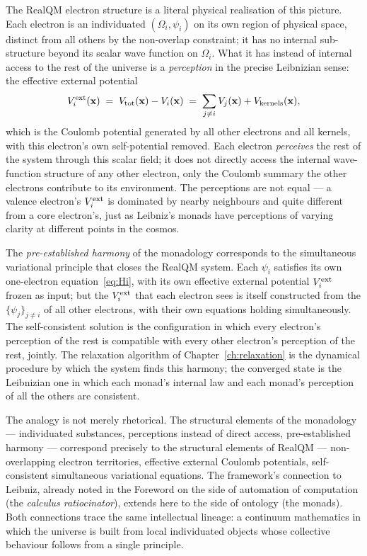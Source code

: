 The RealQM electron structure is a literal physical realisation of this picture. Each electron is an individuated $(\Omega_i, \psi_i)$ on its own region of physical space, distinct from all others by the non-overlap constraint; it has no internal sub-structure beyond its scalar wave function on $\Omega_i$. What it has instead of internal access to the rest of the universe is a \emph{perception} in the precise Leibnizian sense: the effective external potential
\[
V_i^{\rm ext}(\mathbf{x}) \;=\; V_{\rm tot}(\mathbf{x}) - V_i(\mathbf{x}) \;=\; \sum_{j \ne i} V_j(\mathbf{x}) + V_{\rm kernels}(\mathbf{x}),
\]
which is the Coulomb potential generated by all other electrons and all kernels, with this electron's own self-potential removed. Each electron \emph{perceives} the rest of the system through this scalar field; it does not directly access the internal wave-function structure of any other electron, only the Coulomb summary the other electrons contribute to its environment. The perceptions are not equal --- a valence electron's $V_i^{\rm ext}$ is dominated by nearby neighbours and quite different from a core electron's, just as Leibniz's monads have perceptions of varying clarity at different points in the cosmos.

The \emph{pre-established harmony} of the monadology corresponds to the simultaneous variational principle that closes the RealQM system. Each $\psi_i$ satisfies its own one-electron equation~\eqref{eq:Hi}, with its own effective external potential $V_i^{\rm ext}$ frozen as input; but the $V_i^{\rm ext}$ that each electron sees is itself constructed from the $\{\psi_j\}_{j \ne i}$ of all other electrons, with their own equations holding simultaneously. The self-consistent solution is the configuration in which every electron's perception of the rest is compatible with every other electron's perception of the rest, jointly. The relaxation algorithm of Chapter~\ref{ch:relaxation} is the dynamical procedure by which the system finds this harmony; the converged state is the Leibnizian one in which each monad's internal law and each monad's perception of all the others are consistent.

The analogy is not merely rhetorical. The structural elements of the monadology --- individuated substances, perceptions instead of direct access, pre-established harmony --- correspond precisely to the structural elements of RealQM --- non-overlapping electron territories, effective external Coulomb potentials, self-consistent simultaneous variational equations. The framework's connection to Leibniz, already noted in the Foreword on the side of automation of computation (the \emph{calculus ratiocinator}), extends here to the side of ontology (the monads). Both connections trace the same intellectual lineage: a continuum mathematics in which the universe is built from local individuated objects whose collective behaviour follows from a single principle.

